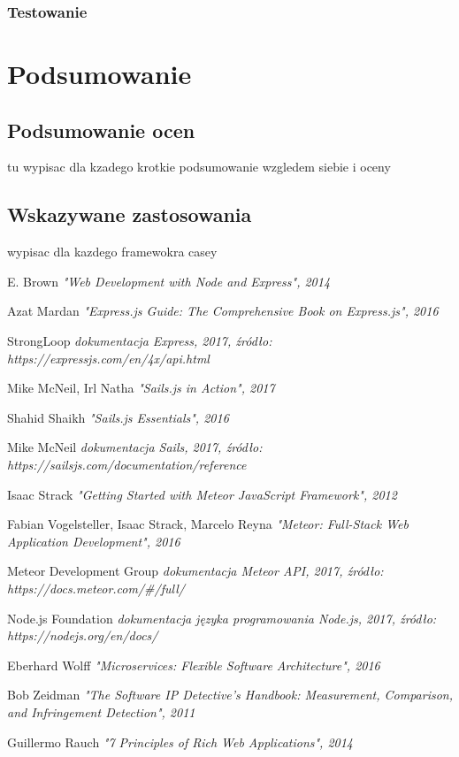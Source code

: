 \documentclass[12pt]{report}
\begin{document}
    \subsection{Testowanie}
    
\chapter{Podsumowanie}
  \section{Podsumowanie ocen}
  tu wypisac dla kzadego krotkie podsumowanie wzgledem siebie i oceny
  \section{Wskazywane zastosowania}
  wypisac dla kazdego framewokra casey


\begin{thebibliography}{99}
    E. Brown
    \textit{"Web Development with Node and Express", 2014}

    Azat Mardan
    \textit{"Express.js Guide: The Comprehensive Book on Express.js", 2016}

    StrongLoop
    \textit{dokumentacja Express, 2017, źródło: https://expressjs.com/en/4x/api.html}

    Mike McNeil, Irl Natha
    \textit{"Sails.js in Action", 2017}

    Shahid Shaikh
    \textit{"Sails.js Essentials", 2016}

    Mike McNeil
    \textit{dokumentacja Sails, 2017, źródło: https://sailsjs.com/documentation/reference}

    Isaac Strack
    \textit{"Getting Started with Meteor JavaScript Framework", 2012}

    Fabian Vogelsteller, Isaac Strack, Marcelo Reyna
    \textit{"Meteor: Full-Stack Web Application Development", 2016}

    Meteor Development Group
    \textit{dokumentacja Meteor API, 2017, źródło: https://docs.meteor.com/\#/full/}

    Node.js Foundation
    \textit{dokumentacja języka programowania Node.js, 2017, źródło: https://nodejs.org/en/docs/}

    Eberhard Wolff
    \textit{"Microservices: Flexible Software Architecture", 2016}

    Bob Zeidman
    \textit{"The Software IP Detective's Handbook: Measurement, Comparison, and Infringement Detection", 2011}
    
    Guillermo Rauch
    \textit{"7 Principles of Rich Web Applications", 2014}

\end{thebibliography}


\listoffigures
\end{document}
